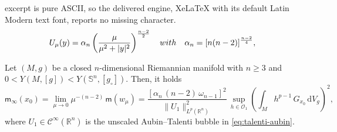 \documentclass[10pt,a4paper]{amsart}
\newcommand{\R}{\mathbb{R}}
\newcommand{\Ss}{\mathbb{S}}
\newcommand{\ud}{\,\mathrm{d}}
\begin{document}
excerpt is pure ASCII, so the delivered engine, XeLaTeX with its default Latin Modern text font, reports no missing character.
\begin{equation}
\label{eq:talenti-aubin}
  U_\mu(y) = \alpha_n \left(\frac{\mu}{\mu^2 + |y|^2}\right)^{\frac{n-2}{2}} \quad {\rm with} 
  \quad \alpha_n = [n(n-2)]^{\frac{n-2}{4}},
\end{equation}

\begin{proposition}
\label{prop:moment-sharp}
Let $(M, g)$ be a closed $n$-dimensional Riemannian manifold with $n \geqslant 3$ and $0 < Y(M,[g]) < Y(\Ss^n,[g_\circ])$. Then, it holds
\begin{equation}
\label{eq:minfty-formula}
\mathsf{m}_\infty(x_0) =\lim_{\mu \to 0} \mu^{-(n-2)}\, \mathsf{m}(w_\mu) = \frac{[\alpha_n\, (n-2)\, \omega_{n-1}]^2}{\|U_1\|_{L^p(\R^n)}^2}\, \sup_{h \in \mathscr{O}_1} \left(\int_M h^{p-1}\, G_{x_0} \ud V_g\right)^2,
\end{equation}
where $U_1 \in \mathcal{C}^\infty(\R^n)$ is the unscaled Aubin--Talenti bubble in \eqref{eq:talenti-aubin}.
\end{proposition}
\end{document}

